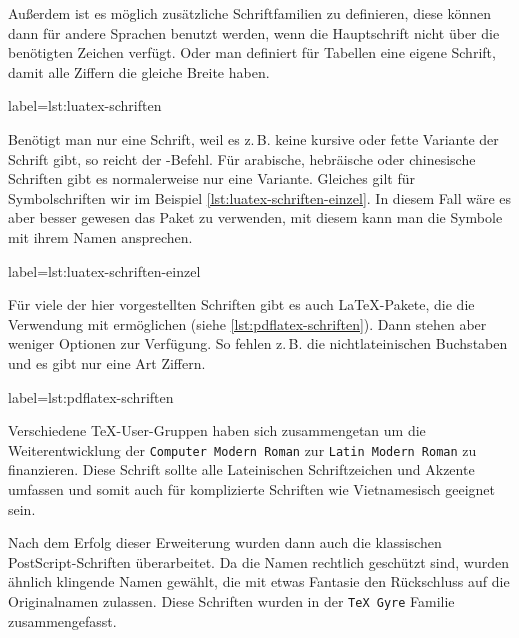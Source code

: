 Außerdem ist es möglich zusätzliche Schriftfamilien zu definieren, 
diese können dann für andere Sprachen benutzt werden, 
wenn die Hauptschrift nicht über die benötigten Zeichen verfügt.
Oder man definiert für Tabellen eine eigene Schrift, 
damit alle Ziffern die gleiche Breite haben. 

\begin{lfgwcode}{label={lst:luatex-schriften}}
  \setsansfont[Ligatures=TeX]{Linux Libertine}
  \setmonofont[Ligatures=TeX]{Linux Libertine}
  \newfontfamily{}
\end{lfgwcode}

Benötigt man nur eine Schrift, weil es z.\,B. keine kursive oder fette Variante der Schrift gibt,
so reicht der -Befehl.
Für arabische, hebräische oder chinesische Schriften gibt es normalerweise nur eine Variante.
Gleiches gilt für Symbolschriften wir im Beispiel \ref{lst:luatex-schriften-einzel}.
In diesem Fall wäre es aber besser gewesen das  Paket zu verwenden, 
mit diesem kann man die Symbole mit ihrem Namen ansprechen.

\begin{lfgwcode}{label={lst:luatex-schriften-einzel}}
 \newfontface{}
\end{lfgwcode}

Für viele der hier vorgestellten Schriften gibt es auch \LaTeX-Pakete, 
die die Verwendung mit \pdfLaTeX{} ermöglichen (siehe \ref{lst:pdflatex-schriften}). 
Dann stehen aber weniger Optionen zur Verfügung.
So fehlen z.\,B. die nichtlateinischen Buchstaben und es gibt nur eine Art Ziffern.

\begin{lfgwcode}{label={lst:pdflatex-schriften}}
  \usepackage{libertine}
\end{lfgwcode}



Verschiedene \TeX-User-Gruppen haben sich zusammengetan um die Weiterentwicklung der 
\texttt{Computer Modern Roman} zur \texttt{Latin Modern Roman} zu finanzieren.
Diese Schrift sollte alle Lateinischen Schriftzeichen und Akzente umfassen und 
somit auch für komplizierte Schriften wie Vietnamesisch geeignet sein.

Nach dem Erfolg dieser Erweiterung wurden dann auch die klassischen PostScript-Schriften überarbeitet.
Da die Namen rechtlich geschützt sind, wurden ähnlich klingende Namen gewählt,
die mit etwas Fantasie den Rückschluss auf die Originalnamen zulassen.
Diese Schriften wurden in der \texttt{TeX Gyre} Familie zusammengefasst.

